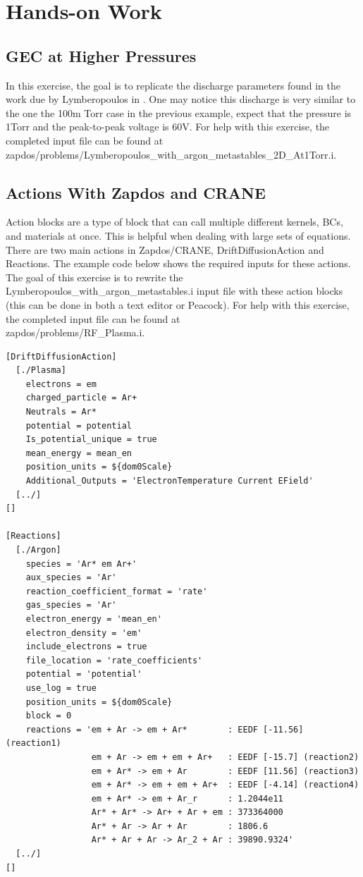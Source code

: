 \documentclass[final]{report}
\begin{document}
 \section{Hands-on Work}
 \subsection{GEC at Higher Pressures}
 In this exercise, the goal is to replicate the discharge parameters found in the work due by Lymberopoulos in \cite{2D_GEC_1Torr}. One may notice this discharge is very similar to the one the 100m Torr case in the previous example, expect that the pressure is 1Torr and the peak-to-peak voltage is 60V. For help with this exercise, the completed input file can be found at zapdos/problems/Lymberopoulos\_with\_argon\_metastables\_2D\_At1Torr.i.

  \subsection{Actions With Zapdos and CRANE}
  Action blocks are a type of block that can call multiple different kernels, BCs, and materials at once. This is helpful when dealing with large sets of equations. There are two main actions in Zapdos/CRANE, DriftDiffusionAction and Reactions. The example code below shows the required inputs for these actions. The goal of this exercise is to rewrite the Lymberopoulos\_with\_argon\_metastables.i input file with these action blocks (this can be done in both a text editor or Peacock). For help with this exercise, the completed input file can be found at \\
  zapdos/problems/RF\_Plasma.i.

  \begin{verbatim}
[DriftDiffusionAction]
  [./Plasma]
    electrons = em
    charged_particle = Ar+
    Neutrals = Ar*
    potential = potential
    Is_potential_unique = true
    mean_energy = mean_en
    position_units = ${dom0Scale}
    Additional_Outputs = 'ElectronTemperature Current EField'
  [../]
[]

[Reactions]
  [./Argon]
    species = 'Ar* em Ar+'
    aux_species = 'Ar'
    reaction_coefficient_format = 'rate'
    gas_species = 'Ar'
    electron_energy = 'mean_en'
    electron_density = 'em'
    include_electrons = true
    file_location = 'rate_coefficients'
    potential = 'potential'
    use_log = true
    position_units = ${dom0Scale}
    block = 0
    reactions = 'em + Ar -> em + Ar*        : EEDF [-11.56] (reaction1)
                 em + Ar -> em + em + Ar+   : EEDF [-15.7] (reaction2)
                 em + Ar* -> em + Ar        : EEDF [11.56] (reaction3)
                 em + Ar* -> em + em + Ar+  : EEDF [-4.14] (reaction4)
                 em + Ar* -> em + Ar_r      : 1.2044e11
                 Ar* + Ar* -> Ar+ + Ar + em : 373364000
                 Ar* + Ar -> Ar + Ar        : 1806.6
                 Ar* + Ar + Ar -> Ar_2 + Ar : 39890.9324'
  [../]
[]
  \end{verbatim}
\end{document}
